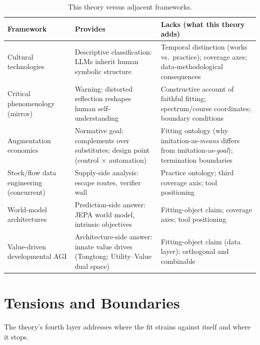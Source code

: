 \documentclass[10pt]{article}
\begin{document}
\begin{table}[t]
\centering
\caption{This theory versus adjacent frameworks.}
\label{tab:frameworks}
\small
\begin{tabular}{p{}p{}p{}}
\toprule
Framework & Provides & Lacks (what this theory adds) \\
\midrule
Cultural technologies \cite{farrell2025cultural, yiu2024transmission} & Descriptive classification: LLMs inherit human symbolic structure & Temporal distinction (works vs.\ practice); coverage axes; data-methodological consequences \\
\addlinespace
Critical phenomenology (mirror) \cite{vallor2024mirror} & Warning: distorted reflection reshapes human self-understanding & Constructive account of faithful fitting; spectrum/course coordinates; boundary conditions \\
\addlinespace
Augmentation economics \cite{brynjolfsson2022turing, engelbart1962augmenting, shneiderman2022human} & Normative goal: complements over substitutes; design point (control $\times$ automation) & Fitting ontology (why imitation-as-\emph{means} differs from imitation-as-\emph{goal}); termination boundaries \\
\addlinespace
Stock/flow data engineering \cite{gharbi2026model} (concurrent) & Supply-side analysis: escape routes, verifier wall & Practice ontology; third coverage axis; tool positioning \\
\addlinespace
World-model architectures \cite{lecun2022path} & Prediction-side answer: JEPA world model, intrinsic objectives & Fitting-object claim; coverage axes; tool positioning \\
\addlinespace
Value-driven developmental AGI \cite{zhao2024heart} & Architecture-side answer: innate value drives (Tongtong; Utility--Value dual space) & Fitting-object claim (data layer); orthogonal and combinable \\
\bottomrule
\end{tabular}
\end{table}

\section{Tensions and Boundaries}\label{sec:tensions}

The theory's fourth layer addresses where the fit strains against itself and where it stops.
\end{document}
